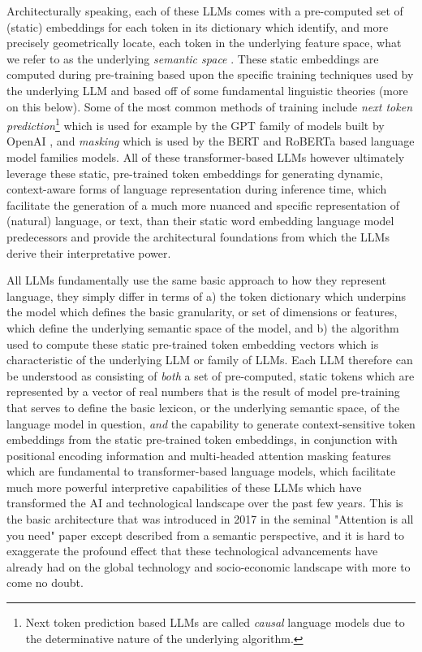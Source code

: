 \documentclass[final]{clv2025-revised}
\begin{document}
Architecturally speaking, each of these LLMs comes with a pre-computed set of (static) embeddings for each token in its dictionary which identify, and more precisely geometrically locate, each token in the underlying feature space, what we refer to as the underlying \textit{semantic space} \cite{worth}. These static embeddings are computed during pre-training based upon the specific training techniques used by the underlying LLM and based off of some fundamental linguistic theories (more on this below). Some of the most common methods of training include \textit{next token prediction}\footnote{Next token prediction based LLMs are called \textit{causal} language models due to the determinative nature of the underlying algorithm.} which is used for example by the GPT family of models built by OpenAI \cite{radford2019language}, and \textit{masking} which is used by the BERT \cite{devlin-etal-2019-bert} and RoBERTa \cite{liu2019roberta} based language model families models. All of these transformer-based LLMs however ultimately leverage these static, pre-trained token embeddings for generating dynamic, context-aware forms of language representation during inference time, which facilitate the generation of a much more nuanced and specific representation of (natural) language, or text, than their static word embedding language model predecessors and provide the architectural foundations from which the LLMs derive their interpretative power. 

All LLMs fundamentally use the same basic approach to how they represent language, they simply differ in terms of a) the token dictionary which underpins the model which defines the basic granularity, or set of dimensions or features, which define the underlying semantic space of the model, and b) the algorithm used to compute these static pre-trained token embedding vectors which is characteristic of the underlying LLM or family of LLMs. Each LLM therefore can be understood as consisting of \textit{both} a set of pre-computed, static tokens which are represented by a vector of real numbers that is the result of model pre-training that serves to define the basic lexicon, or the underlying semantic space, of the language model in question, \textit{and} the capability to generate context-sensitive token embeddings from the static pre-trained token embeddings, in conjunction with positional encoding information and multi-headed attention masking features which are fundamental to transformer-based language models, which facilitate much more powerful interpretive capabilities of these LLMs which have transformed the AI and technological landscape over the past few years. This is the basic architecture that was introduced in 2017 in the seminal "Attention is all you need" paper \cite{vaswani} except described from a semantic perspective, and it is hard to exaggerate the profound effect that these technological advancements have already had on the global technology and socio-economic landscape with more to come no doubt.
\end{document}
